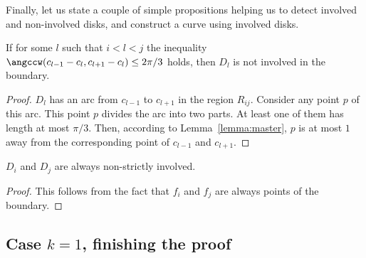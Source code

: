\begin{enumerate}[label={\bf Case \arabic*: }, wide, labelwidth=!, labelindent=0pt]



Finally, let us state a couple of simple propositions helping us to detect involved and non-involved disks, and construct a curve using involved disks.

\begin{observation}
If for some $l$ such that $i < l < j$ the inequality $\angccw(c_{l-1} - c_l, c_{l+1} - c_l)\leq 2\pi/3$ holds, then $D_l$ is not involved in the boundary.
\end{observation}

\begin{proof}
$D_l$ has an arc from $c_{l-1}$ to $c_{l+1}$ in the region $R_{ij}$. Consider any point $p$ of this arc. This point $p$ divides the arc into two parts. At least one of them has length at most $\pi/3$. Then, according to Lemma~\ref{lemma:master}, $p$ is at most $1$ away from the corresponding point of $c_{l-1}$ and $c_{l+1}$.
\end{proof}

\begin{observation}
$D_i$ and $D_j$ are always non-strictly involved.
\end{observation}

\begin{proof}
This follows from the fact that $f_i$ and $f_j$ are always points of the boundary.
\end{proof}

\subsection{Case $k = 1$, finishing the proof}




\end{enumerate}

